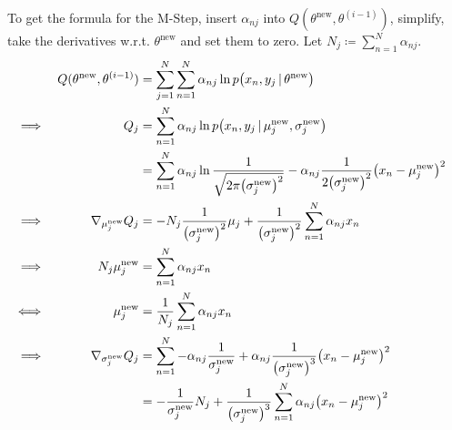					To get the formula for the M-Step, insert \( \alpha_{nj} \) into \( Q(\theta^\textrm{new}, \theta^{(i - 1)}) \), simplify, take the derivatives w.r.t. \(\theta^\textrm{new}\) and set them to zero. Let \( N_j \coloneqq \sum_{n = 1}^{N} \alpha_{nj} \).
					\begin{align}
						         &  & Q(\theta^\textrm{new}, \theta^{(i - 1)}) & = \sum_{j = 1}^{N} \sum_{n = 1}^{N} \alpha_{nj} \ln p\big(x_n, y_j \given \theta^\textrm{new}\big)                                                                                        & \\
						\implies &  & Q_j                                      & = \sum_{n = 1}^{N} \alpha_{nj} \ln p\big(x_n, y_j \given \mu_j^\textrm{new}, \sigma_j^\textrm{new}\big)                                                                                   & \\
						         &  &                                          & = \sum_{n = 1}^{N} \alpha_{nj} \ln \frac{1}{\sqrt{2\pi\big(\sigma_j^\textrm{new}\big)^2}} - \alpha_{nj} \frac{1}{2\big(\sigma_j^\textrm{new}\big)^2} \big(x_n - \mu_j^\textrm{new}\big)^2 & \\
						\implies &  & \nabla_{\mu_j^\textrm{new}} Q_j          & = -N_j\frac{1}{\big(\sigma_j^\textrm{new}\big)^2}\mu_j + \frac{1}{\big(\sigma_j^\textrm{new}\big)^2} \sum_{n = 1}^{N} \alpha_{nj} x_n                                                     & \\
						\implies &  & N_j\mu_j^\textrm{new}                    & = \sum_{n = 1}^{N} \alpha_{nj} x_n                                                                                                                                                        & \\
						\iff     &  & \mu_j^\textrm{new}                       & = \frac{1}{N_j} \sum_{n = 1}^{N} \alpha_{nj} x_n                                                                                                                                          & \\
						\implies &  & \nabla_{\sigma_j^\textrm{new}} Q_j       & = \sum_{n = 1}^{N} -\alpha_{nj} \frac{1}{\sigma_j^\textrm{new}} + \alpha_{nj} \frac{1}{\big(\sigma_j^\textrm{new}\big)^3} \big(x_n - \mu_j^\textrm{new}\big)^2                            & \\
						         &  &                                          & = -\frac{1}{\sigma_j^\textrm{new}} N_j + \frac{1}{\big(\sigma_j^\textrm{new}\big)^3} \sum_{n = 1}^{N} \alpha_{nj} \big(x_n - \mu_j^\textrm{new}\big)^2                                    & \\

\end{align}
